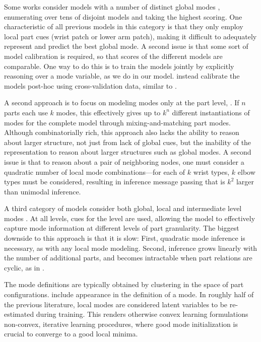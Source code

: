  Some works consider models with a number 
of distinct global modes \citep{everingham2011,ramanan-faces,wang2008multiple}, 
enumerating over tens of disjoint models and taking the highest scoring.  One 
characteristic of all previous models in this category is that they only employ 
local part cues (\eg wrist patch or lower arm patch), making it difficult to 
adequately represent and predict the best global mode.  A second issue is that 
some sort of model calibration is required, so that scores of the different 
models are comparable.  One way to do this is to train the models jointly by 
explicitly reasoning over a mode variable, as we do in our model.  
\citet{everingham2011} instead calibrate the models post-hoc using 
cross-validation data, similar to \citet{esvm}.

 A second approach is to focus on modeling modes only at 
the part level, \eg \citet{deva2011}.  If $n$ parts each use $k$ modes, this 
effectively gives up to $k^n$ different instantiations of modes for the 
complete model through mixing-and-matching part modes.  Although 
combinatorially rich, this approach also lacks the ability to reason about 
larger structure, not just from lack of global cues, but the inability of the 
representation to reason about larger structures such as global modes.  A 
second issue is that to reason about a pair of neighboring nodes, one must 
consider a quadratic number of local mode combinations---\eg for each of $k$ 
wrist types, $k$ elbow types must be considered, resulting in inference message 
passing that is $k^2$ larger than unimodal inference.

A third category of models consider both global, local and intermediate level 
modes \citep{wang2011,sun2011,batra2012,tianexploring}.  At all levels, cues 
for the level are used, allowing the model to effectively capture mode 
information at different levels of part granularity.  The biggest downside to 
this approach is that it is slow:  First, quadratic mode inference is 
necessary, as with any local mode modeling.  Second, inference grows linearly 
with the number of additional parts, and becomes intractable when part 
relations are cyclic, as in \citet{wang2011, batra2012}.

The mode definitions are typically obtained by clustering in the space of part 
configurations.  \citet{everingham2011} include appearance in the definition of 
a mode.  In roughly half of the previous literature, local modes are considered 
latent variables to be re-estimated during training.  This renders otherwise 
convex learning formulations non-convex, iterative learning procedures, where 
good mode initialization is crucial to converge to a good local minima.


